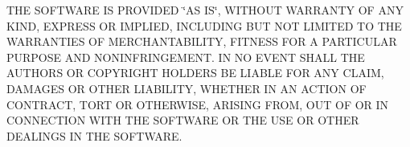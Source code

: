 T\+HE S\+O\+F\+T\+W\+A\+RE IS P\+R\+O\+V\+I\+D\+ED \char`\"{}\+A\+S I\+S\char`\"{}, W\+I\+T\+H\+O\+UT W\+A\+R\+R\+A\+N\+TY OF A\+NY K\+I\+ND, E\+X\+P\+R\+E\+SS OR I\+M\+P\+L\+I\+ED, I\+N\+C\+L\+U\+D\+I\+NG B\+UT N\+OT L\+I\+M\+I\+T\+ED TO T\+HE W\+A\+R\+R\+A\+N\+T\+I\+ES OF M\+E\+R\+C\+H\+A\+N\+T\+A\+B\+I\+L\+I\+TY, F\+I\+T\+N\+E\+SS F\+OR A P\+A\+R\+T\+I\+C\+U\+L\+AR P\+U\+R\+P\+O\+SE A\+ND N\+O\+N\+I\+N\+F\+R\+I\+N\+G\+E\+M\+E\+NT. IN NO E\+V\+E\+NT S\+H\+A\+LL T\+HE A\+U\+T\+H\+O\+RS OR C\+O\+P\+Y\+R\+I\+G\+HT H\+O\+L\+D\+E\+RS BE L\+I\+A\+B\+LE F\+OR A\+NY C\+L\+A\+IM, D\+A\+M\+A\+G\+ES OR O\+T\+H\+ER L\+I\+A\+B\+I\+L\+I\+TY, W\+H\+E\+T\+H\+ER IN AN A\+C\+T\+I\+ON OF C\+O\+N\+T\+R\+A\+CT, T\+O\+RT OR O\+T\+H\+E\+R\+W\+I\+SE, A\+R\+I\+S\+I\+NG F\+R\+OM, O\+UT OF OR IN C\+O\+N\+N\+E\+C\+T\+I\+ON W\+I\+TH T\+HE S\+O\+F\+T\+W\+A\+RE OR T\+HE U\+SE OR O\+T\+H\+ER D\+E\+A\+L\+I\+N\+GS IN T\+HE S\+O\+F\+T\+W\+A\+RE. 